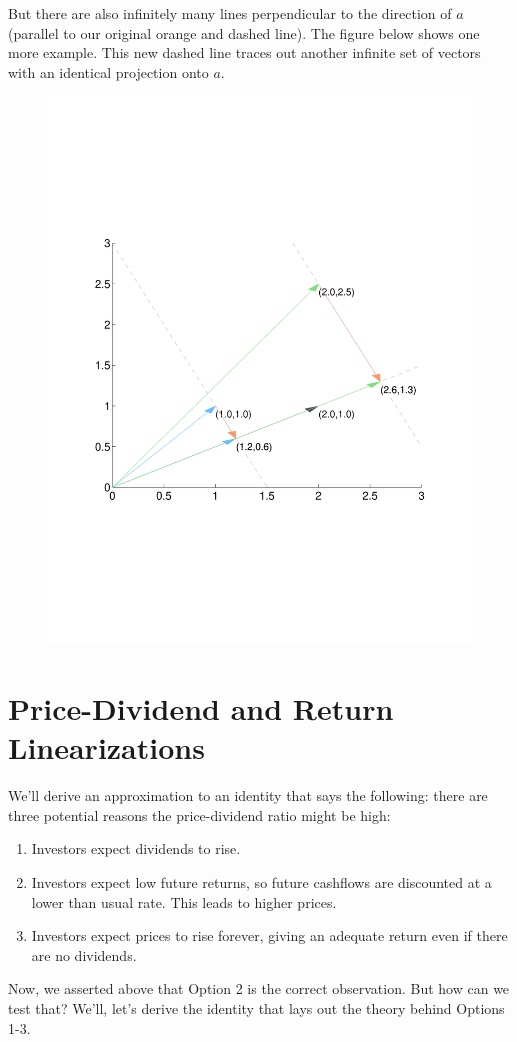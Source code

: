 \documentclass[a4paper,12pt]{scrartcl}
\begin{document}
But there are also infinitely many lines perpendicular to the direction
of $a$ (parallel to our original orange and dashed line). The figure
below shows one more example. This new dashed line traces out another
infinite set of vectors with an identical projection onto $a$.
\begin{figure}[htpb!]
  \centering
  \includegraphics[scale=0.6, trim={2cm, 7cm, 2cm, 7cm}, clip]{Plots/StateSpaceGeometry6.pdf}
\end{figure}

\section{Price-Dividend and Return Linearizations}

We'll derive an approximation to an identity that says the following:
there are three potential reasons the price-dividend ratio might be
high:
\begin{enumerate}
    \item Investors expect dividends to rise.
    \item Investors expect low future returns, so future cashflows
	are discounted at a lower than usual rate. This leads
	to higher prices.
    \item Investors expect prices to rise forever, giving an
	adequate return even if there are no dividends.
\end{enumerate}
Now, we asserted above that Option 2 is the correct observation.
But how can we test that?  We'll, let's derive the identity that
lays out the theory behind Options 1-3.
\end{document}
